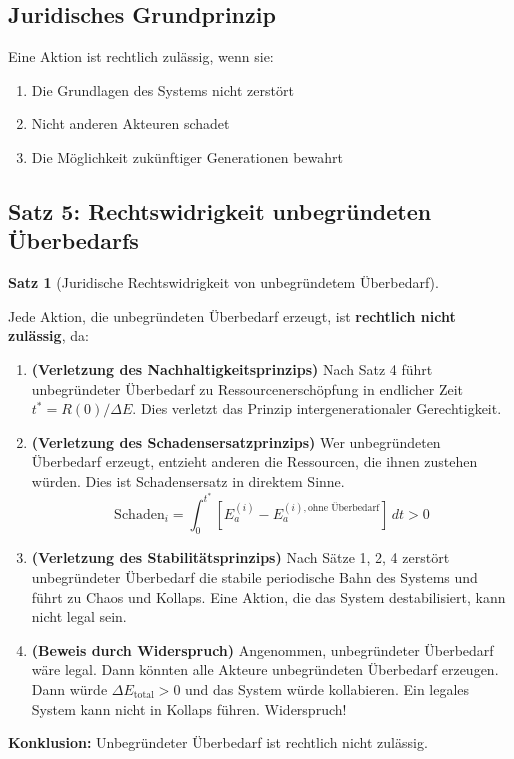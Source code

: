 \documentclass[a4paper, 12pt, twoside, openright]{report}
\theoremstyle{definition}
\theoremstyle{definition}
\newtheorem{satz}{Satz}[chapter]
\begin{document}
\subsection{Juridisches Grundprinzip}

Eine Aktion ist rechtlich zulässig, wenn sie:

\begin{enumerate}
    \item Die Grundlagen des Systems nicht zerstört
    \item Nicht anderen Akteuren schadet
    \item Die Möglichkeit zukünftiger Generationen bewahrt
\end{enumerate}

\subsection{Satz 5: Rechtswidrigkeit unbegründeten Überbedarfs}

\begin{satz}[Juridische Rechtswidrigkeit von unbegründetem Überbedarf]\label{satz:rechtlich}
    
    Jede Aktion, die unbegründeten Überbedarf erzeugt, ist \textbf{rechtlich nicht zulässig}, da:
    
    \begin{enumerate}
        \item \textbf{(Verletzung des Nachhaltigkeitsprinzips)} Nach Satz 4 führt unbegründeter Überbedarf zu Ressourcenerschöpfung in endlicher Zeit $t^* = R(0)/\Delta E$. Dies verletzt das Prinzip intergenerationaler Gerechtigkeit.
        
        \item \textbf{(Verletzung des Schadensersatzprinzips)} Wer unbegründeten Überbedarf erzeugt, entzieht anderen die Ressourcen, die ihnen zustehen würden. Dies ist Schadensersatz in direktem Sinne.
        \begin{equation}
            \text{Schaden}_i = \int_0^{t^*} [E_a^{(i)} - E_a^{(i), \text{ohne Überbedarf}}] \, dt > 0
        \end{equation}
        
        \item \textbf{(Verletzung des Stabilitätsprinzips)} Nach Sätze 1, 2, 4 zerstört unbegründeter Überbedarf die stabile periodische Bahn des Systems und führt zu Chaos und Kollaps. Eine Aktion, die das System destabilisiert, kann nicht legal sein.
        
        \item \textbf{(Beweis durch Widerspruch)} Angenommen, unbegründeter Überbedarf wäre legal. Dann könnten alle Akteure unbegründeten Überbedarf erzeugen. Dann würde $\Delta E_{\text{total}} > 0$ und das System würde kollabieren. Ein legales System kann nicht in Kollaps führen. Widerspruch!
    \end{enumerate}
    
    \textbf{Konklusion:} Unbegründeter Überbedarf ist rechtlich nicht zulässig.
\end{satz}
\end{document}
